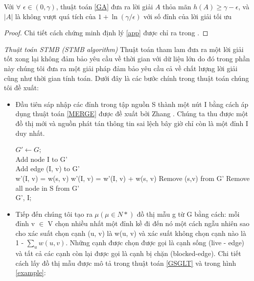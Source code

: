 \begin{theo} Với $\forall$ $\epsilon \in (0, \gamma)$, thuật toán \ref{GA} đưa ra lời giải $A$ thỏa mãn $h(A) \geq \gamma- \epsilon$, và $|A|$ là không vượt quá tích của $1+\ln(\gamma/ \epsilon)$ với số đỉnh của lời giải tối ưu \label{app}
\end{theo}		
\begin{proof}
	Chi tiết cách chứng minh định lý \ref{app} được chỉ ra trong \cite{snam}. 
\end{proof}
{\itshape Thuật toán STMB (STMB algorithm)}
Thuật toán tham lam đưa ra một lời giải tốt xong lại không đảm bảo yêu cầu về thời gian với dữ liệu lớn do đó trong phần này chúng tôi đưa ra một giải pháp đảm bảo yêu cầu cả về chất lượng lời giải cũng như thời gian tính toán. Dưới đây là các bước chính trong thuật toán chúng tôi đề xuất:
\begin {itemize}
\item Đầu tiên sáp nhập các đỉnh trong tập nguồn S thành một nút I bằng cách áp dụng thuật toán \ref{MERGE} được đề xuất bởi Zhang \cite{zhang39}. Chúng ta thu được một đồ thị mới và nguồn phát tán thông tin sai lệch bây giờ chỉ còn là một đỉnh I duy nhất.
\begin{algorithm}[hpt]			
	$G' \leftarrow G$;
	\\
	Add node I to G'			
	\\
	{
		{
			{
				Add edge (I, v) to G'
				\\
				w'(I, v) = w(s, v)
			}
			{
				w'(I, v) = w'(I, v) + w(s, v)
			}
			Remove (s,v) from G'
		}
	}
	Remove all node in S from G'
	\\
	\Return G', I;
	\caption{MERGE Algorithm(MERGE)}
	\label{MERGE}
\end{algorithm}				
\item Tiếp đến chúng tôi tạo ra $\mu(\mu \in N*)$ đồ thị mẫu g từ G bằng cách: mỗi đỉnh v $\in$ V chọn nhiều nhất một đỉnh kề đi đến nó một cách ngẫu nhiên sao cho xác suất chọn cạnh (u, v) là w(u, v) và xác suất không chọn cạnh nào là 1 - $\sum_{u} w(u, v)$. Những cạnh được chọn được gọi là cạnh sống  (live - edge) và tất cả các cạnh còn lại được gọi là cạnh bị chặn (blocked-edge). Chi tiết cách lấy đồ thị mẫu được mô tả trong thuật toán \ref{GSGLT} và trong hình \ref{example}: 
\begin{figure}[htb]

\end{figure}
\end{itemize}
